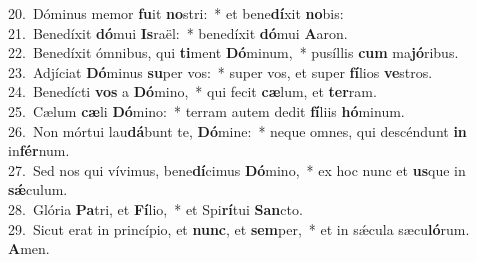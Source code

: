 {20.~}Dóminus memor \textbf{fu}it \textbf{no}stri:~* et bene\textbf{dí}xit \textbf{no}bis:\\
{21.~}Benedíxit \textbf{dó}mui \textbf{Is}raël:~* benedíxit \textbf{dó}mui \textbf{A}aron.\\
{22.~}Benedíxit ómnibus, qui \textbf{ti}ment \textbf{Dó}minum,~* pusíllis \textbf{cum} ma\textbf{jó}ribus.\\
{23.~}Adjíciat \textbf{Dó}minus \textbf{su}per vos:~* super vos, et super \textbf{fí}lios \textbf{ve}stros.\\
{24.~}Benedícti \textbf{vos} a \textbf{Dó}mino,~* qui fecit \textbf{cæ}lum, et \textbf{ter}ram.\\
{25.~}Cælum \textbf{cæ}li \textbf{Dó}mino:~* terram autem dedit \textbf{fí}liis \textbf{hó}minum.\\
{26.~}Non mórtui lau\textbf{dá}bunt te, \textbf{Dó}mine:~* neque omnes, qui descéndunt \textbf{in} in\textbf{fér}num.\\
{27.~}Sed nos qui vívimus, bene\textbf{dí}cimus \textbf{Dó}mino,~* ex hoc nunc et \textbf{us}que in \textbf{sǽ}culum.\\
{28.~}Glória \textbf{Pa}tri, et \textbf{Fí}lio,~* et Spi\textbf{rí}tui \textbf{San}cto.\\
{29.~}Sicut erat in princípio, et \textbf{nunc}, et \textbf{sem}per,~* et in sǽcula sæcu\textbf{ló}rum. \textbf{A}men.\\
